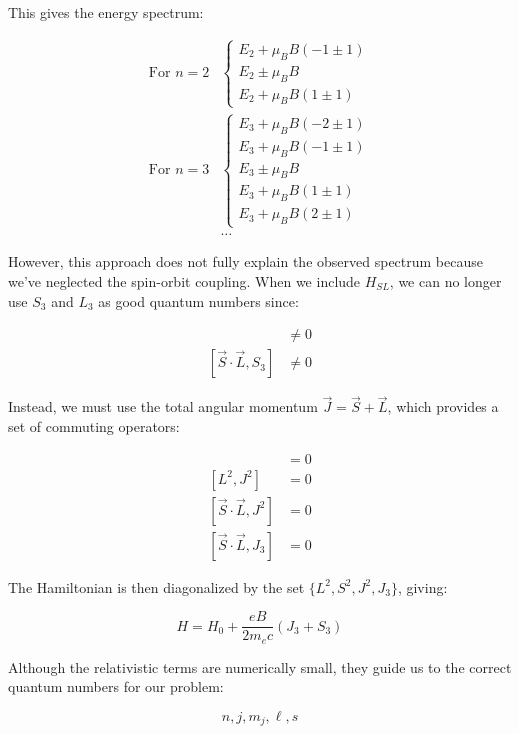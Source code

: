This gives the energy spectrum:

\begin{align}
\text{For } n=2&\left\{\begin{array}{l}
E_2+\mu_B B(-1\pm 1)\\
E_2\pm\mu_B B\\
E_2+\mu_B B(1\pm 1)
\end{array}\right.\\
\text{For } n=3&\left\{\begin{array}{l}
E_3+\mu_B B(-2\pm 1)\\
E_3+\mu_B B(-1\pm 1)\\
E_3\pm\mu_B B\\
E_3+\mu_B B(1\pm 1)\\
E_3+\mu_B B(2\pm 1)
\end{array}\right.\\
&\ldots
\end{align}

However, this approach does not fully explain the observed spectrum because we've neglected the spin-orbit coupling. When we include $H_{SL}$, we can no longer use $S_3$ and $L_3$ as good quantum numbers since:

\begin{align}
[\vec{S}\cdot\vec{L}, L_3] &\neq 0 \\
[\vec{S}\cdot\vec{L}, S_3] &\neq 0
\end{align}

Instead, we must use the total angular momentum $\vec{J}=\vec{S}+\vec{L}$, which provides a set of commuting operators:

\begin{align}
[S^2, J^2] &= 0\\
[L^2, J^2] &= 0\\
[\vec{S}\cdot\vec{L}, J^2] &= 0 \\
[\vec{S}\cdot\vec{L}, J_3] &= 0
\end{align}

The Hamiltonian is then diagonalized by the set $\{L^2, S^2, J^2, J_3\}$, giving:

\begin{equation}
H=H_0+\frac{eB}{2m_e c}(J_3+S_3)
\end{equation}


Although the relativistic terms are numerically small, they guide us to the correct quantum numbers for our problem:

\begin{equation}
n, j, m_j, \ell, s
\end{equation}

